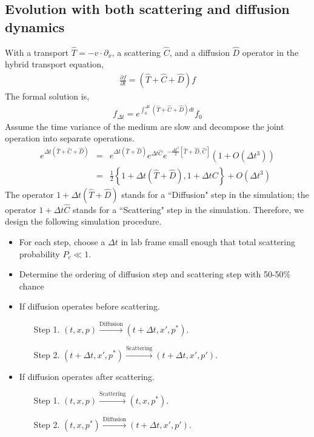 \documentclass[aps, prc, reprint, amsmath, groupedaddress, nofootinbib]{revtex4-1}
\begin{document}
\begin{appendices}
\section{Evolution with both scattering and diffusion dynamics}
With a transport $\hat{T} = -v\cdot \partial_x$, a scattering $\hat{C}$, and a diffusion $\hat{D}$ operator in the hybrid transport equation,
\begin{eqnarray}
\frac{\partial f}{\partial t} = \left( \hat{T} + \hat{C} + \hat{D} \right) f
\end{eqnarray}
The formal solution is,
\begin{eqnarray}
f_{\Delta t} = e^{\int_0^{\Delta t}  \left( \hat{T} + \hat{C} + \hat{D} \right) dt}f_0
\end{eqnarray}
Assume the time variance of the medium are slow and decompose the joint operation into separate operations.
\begin{eqnarray}
e^{ \Delta t\left(\hat{T} +\hat{C} + \hat{D} \right)} &=&
\nonumber
e^{\Delta t \left(\hat{T} + \hat{D}\right) } e^{\Delta t \hat{C}}   e^{-\frac{\Delta t^2}{2} [\hat{T}+\hat{D}, \hat{C}]}\left(1+O(\Delta t^3)\right) \\
\nonumber
&=& \frac{1}{2}  \left\{
1+\Delta t \left( \hat{T}+\hat{D} \right), 1+\Delta t C
\right\} + O(\Delta t^3) 
\end{eqnarray}
The operator $1 + \Delta t ( \hat{T}  + \hat{D} )$ stands for a ``Diffusion" step in the simulation; the operator $1+\Delta t \hat{C}$ stands for a ``Scattering" step in the simulation. 
Therefore, we design the following simulation procedure.
\begin{itemize}
\item For each step, choose a $\Delta t$ in lab frame small enough that total scattering probability $P_c \ll 1$.
\item Determine the ordering of diffusion step and scattering step with 50-50\% chance
\item If diffusion operates before scattering.
\begin{itemize}
\item[Step 1.] $(t, x, p) \xrightarrow{\textrm{Diffusion}} (t+\Delta t, x', p^*)$.
\item[Step 2.] $(t+\Delta t, x', p^*) \xrightarrow{\textrm{Scattering}} (t+\Delta t, x', p')$.
\end{itemize}
\item If diffusion operates after scattering.
\begin{itemize}
\item[Step 1.] $(t, x, p) \xrightarrow{\textrm{Scattering}} (t, x, p^*)$.
\item[Step 2.] $(t, x, p^*)  \xrightarrow{\textrm{Diffusion}} (t+\Delta t, x', p')$.
\end{itemize}
\end{itemize}




\end{appendices}
\end{document}
